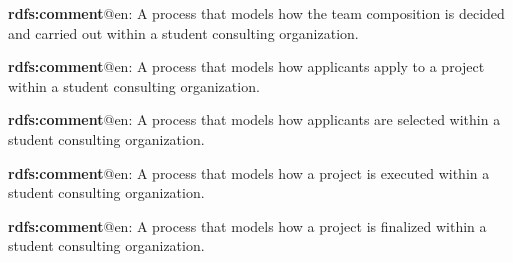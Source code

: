 \documentclass[a4paper, DIV=13, BCOR=0cm]{scrbook}
\begin{document}
\begin{mdframed}[style=onto-3, frametitle={Project Team Making Process}]
	{%
		\begin{compactitem}
			\item \textbf{rdfs:comment}@en: A process that models how the team composition is decided and carried out within a student consulting organization.
		\end{compactitem}
	} %
\end{mdframed}

\begin{mdframed}[style=onto-4, frametitle={Project Team Application Process}]
	{%
		\begin{compactitem}
			\item \textbf{rdfs:comment}@en: A process that models how applicants apply to a project within a student consulting organization.
		\end{compactitem}
	} %
\end{mdframed}

\begin{mdframed}[style=onto-4, frametitle={Project Team Selection Process}]
	{%
		\begin{compactitem}
			\item \textbf{rdfs:comment}@en: A process that models how applicants are selected within a student consulting organization.
		\end{compactitem}
	} %
\end{mdframed}

\begin{mdframed}[style=onto-2, frametitle={Project Execution Process}]
	{%
		\begin{compactitem}
			\item \textbf{rdfs:comment}@en: A process that models how a project is executed within a student consulting organization.
		\end{compactitem}
	} %
\end{mdframed}

\begin{mdframed}[style=onto-2, frametitle={Project Finalization Process}]
	{%
		\begin{compactitem}
			\item \textbf{rdfs:comment}@en: A process that models how a project is finalized within a student consulting organization.
		\end{compactitem}
	} %
\end{mdframed}
\end{document}
